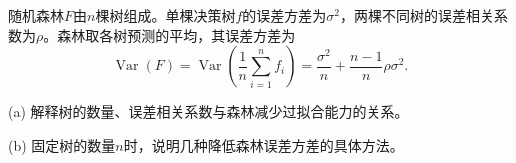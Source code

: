 随机森林\(F\)由\(n\)棵树组成。单棵决策树\(f\)的误差方差为\(\sigma^2\)，两棵不同树的误差相关系数为\(\rho\)。森林取各树预测的平均，其误差方差为
\[
\operatorname{Var}(F)=\operatorname{Var}\left(\frac1n\sum_{i=1}^nf_i\right)
=\frac{\sigma^2}{n}+\frac{n-1}{n}\rho\sigma^2.
\]


(a) 解释树的数量、误差相关系数与森林减少过拟合能力的关系。


(b) 固定树的数量\(n\)时，说明几种降低森林误差方差的具体方法。
